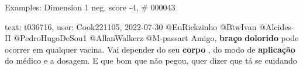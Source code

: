 \begin{frame}{Examples: Dimension 1 neg, score -4, \# 000043}
\footnotesize
\begin{alertblock}{text: t036716, user: Cook221105, 2022-07-30}
@EuRickzinho @BtwIvan @Alcides-II @PedroHugoDeSou1 @AllanWalkerz @M-passart 
Amigo, \textbf{braço} \textbf{dolorido} pode ocorrer em qualquer vacina. Vai 
depender do seu \textbf{corpo} , do modo de \textbf{aplicação} do médico e a 
dosagem. E que bom que não pegou, quer dizer que tá se cuidando 
\end{alertblock}
\end{frame}
